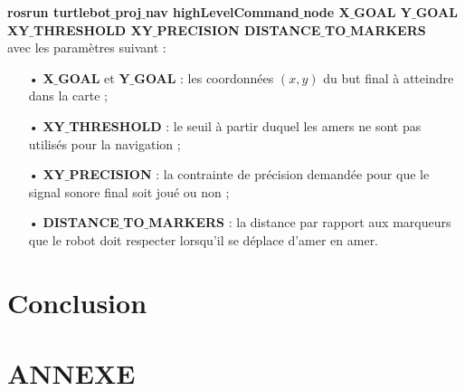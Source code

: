\documentclass[10pt,a4paper]{article}
\begin{document}
\textbf{rosrun turtlebot$\_$proj$\_$nav highLevelCommand$\_$node X$\_$GOAL Y$\_$GOAL XY$\_$THRESHOLD XY$\_$PRECISION DISTANCE$\_$TO$\_$MARKERS}\\

\noindent avec les paramètres suivant : 
\begin{itemize}
\item[•] \textbf{X$\_$GOAL} et \textbf{Y$\_$GOAL} : les coordonnées $(x,y)$ du but final à atteindre dans la carte ; 
\item[•] \textbf{XY$\_$THRESHOLD} : le seuil à partir duquel les amers ne sont pas utilisés pour la navigation ; 
\item[•] \textbf{XY$\_$PRECISION} : la contrainte de précision demandée pour que le signal sonore final soit joué ou non ; 
\item[•] \textbf{DISTANCE$\_$TO$\_$MARKERS} : la distance par rapport aux marqueurs que le robot doit respecter lorsqu'il se déplace d'amer en amer.
\end{itemize}


\newpage
\section{Conclusion}
\label{sec:conclusion}

\newpage
\listoffigures
\newpage

\section*{ANNEXE}
\end{document}
